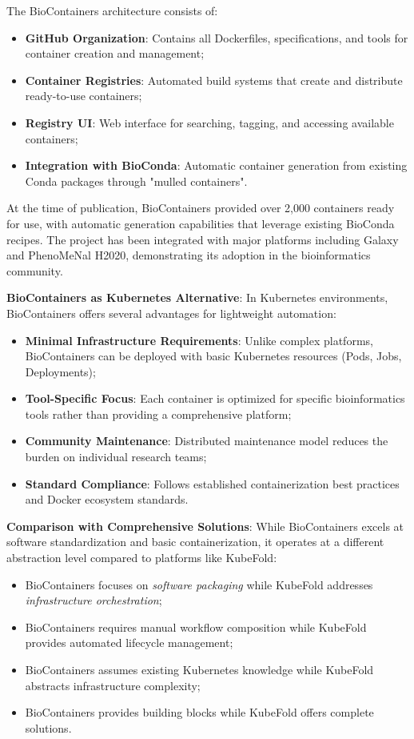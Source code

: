The BioContainers architecture consists of:
\begin{itemize}
    \item \textbf{GitHub Organization}: Contains all Dockerfiles, specifications, and tools for container creation and management;
    \item \textbf{Container Registries}: Automated build systems that create and distribute ready-to-use containers;
    \item \textbf{Registry UI}: Web interface for searching, tagging, and accessing available containers;
    \item \textbf{Integration with BioConda}: Automatic container generation from existing Conda packages through "mulled containers".
\end{itemize}

At the time of publication, BioContainers provided over 2,000 containers ready for use, with automatic generation capabilities that leverage existing BioConda recipes.
The project has been integrated with major platforms including Galaxy and PhenoMeNal H2020, demonstrating its adoption in the bioinformatics community.

\textbf{BioContainers as Kubernetes Alternative}: In Kubernetes environments, BioContainers offers several advantages for lightweight automation:

\begin{itemize}
    \item \textbf{Minimal Infrastructure Requirements}: Unlike complex platforms, BioContainers can be deployed with basic Kubernetes resources (Pods, Jobs, Deployments);
    \item \textbf{Tool-Specific Focus}: Each container is optimized for specific bioinformatics tools rather than providing a comprehensive platform;
    \item \textbf{Community Maintenance}: Distributed maintenance model reduces the burden on individual research teams;
    \item \textbf{Standard Compliance}: Follows established containerization best practices and Docker ecosystem standards.
\end{itemize}

\textbf{Comparison with Comprehensive Solutions}: While BioContainers excels at software standardization and basic containerization, it operates at a different abstraction level compared to platforms like KubeFold:

\begin{itemize}
    \item BioContainers focuses on \textit{software packaging} while KubeFold addresses \textit{infrastructure orchestration};
    \item BioContainers requires manual workflow composition while KubeFold provides automated lifecycle management;
    \item BioContainers assumes existing Kubernetes knowledge while KubeFold abstracts infrastructure complexity;
    \item BioContainers provides building blocks while KubeFold offers complete solutions.
\end{itemize}

